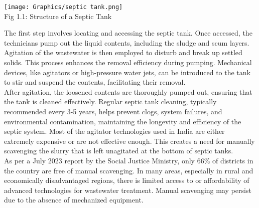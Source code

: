 \documentclass[a4,10pt]{report}
\begin{document}
\begin{center}
    \texttt{[image: Graphics/septic tank.png]} \\
    Fig 1.1: Structure of a Septic Tank \\
\end{center}

The first step involves locating and accessing the septic tank. Once accessed, the technicians pump out the liquid contents, including the sludge and scum layers. Agitation of the wastewater is then employed to disturb and break up settled solids. This process enhances the removal efficiency during pumping. Mechanical devices, like agitators or high-pressure water jets, can be introduced to the tank to stir and suspend the contents, facilitating their removal. 
\vspace{2mm} \\
After agitation, the loosened contents are thoroughly pumped out, ensuring that the tank is cleaned effectively. Regular septic tank cleaning, typically recommended every 3-5 years, helps prevent clogs, system failures, and environmental contamination, maintaining the longevity and efficiency of the septic system. Most of the agitator technologies used in India are either extremely expensive or are not effective enough. This creates a need for manually scavenging the slurry that is left unagitated at the bottom of septic tanks. 
\vspace{2mm} \\
As per a July 2023 report by the Social Justice Ministry, only 66\% of districts in the country are free of manual scavenging.\cite{manual_scavenging} In many areas, especially in rural and economically disadvantaged regions, there is limited access to or affordability of advanced technologies for wastewater treatment. Manual scavenging may persist due to the absence of mechanized equipment.
\end{document}
